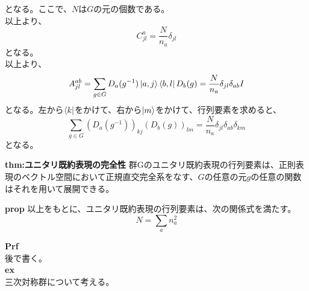 \documentclass[a4paper,11pt]{jsarticle}
\begin{document}
となる。ここで、$N$は$G$の元の個数である。\\
以上より、
\begin{equation}
    C_{jl}^a = \frac{N}{n_a}\delta_{jl}
\end{equation}
となる。\\
以上より、
\begin{equation}
    A^{ab}_{jl} =\sum _{g \in G} D_a (g^{-1}) \ket*{a,j}\bra{b,l}D_b(g) = \frac{N}{n_a}\delta_{jl}\delta_{ab}I
\end{equation}
となる。左から$\bra{k}$をかけて、右から$\ket{m}$をかけて、行列要素を求めると、
\begin{equation}
    \sum _{g \in G} (D_a (g^{-1}))_{kj}(D_b(g))_{lm} = \frac{N}{n_a}\delta_{jl}\delta_{ab}\delta_{km}
\end{equation}
となる。\\

\begin{itembox}[l]{\textbf{thm:ユニタリ既約表現の完全性}}
    群Gのユニタリ既約表現の行列要素は、正則表現のベクトル空間において正規直交完全系をなす、$G$の任意の元$g$の任意の関数はそれを用いて展開できる。

\end{itembox}

\begin{itembox}[l]{\textbf{prop}}
    以上をもとに、ユニタリ既約表現の行列要素は、次の関係式を満たす。
    \begin{equation}
    N=\sum_{a} n_a^2 
    \end{equation}
\end{itembox}
\textbf{Prf}\\
後で書く。\\
\textbf{ex}\\
三次対称群について考える。\\
\end{document}
